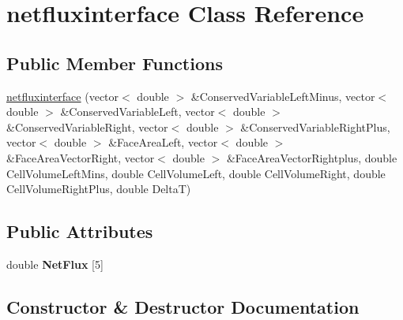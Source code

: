 \hypertarget{classnetfluxinterface}{}\section{netfluxinterface Class Reference}
\label{classnetfluxinterface}
\subsection*{Public Member Functions}
\begin{DoxyCompactItemize}
\item 
\hyperlink{classnetfluxinterface_aaa51271f4ed3cf28e7bf134cdb608589}{netfluxinterface} (vector$<$ double $>$ \&Conserved\+Variable\+Left\+Minus, vector$<$ double $>$ \&Conserved\+Variable\+Left, vector$<$ double $>$ \&Conserved\+Variable\+Right, vector$<$ double $>$ \&Conserved\+Variable\+Right\+Plus, vector$<$ double $>$ \&Face\+Area\+Left, vector$<$ double $>$ \&Face\+Area\+Vector\+Right, vector$<$ double $>$ \&Face\+Area\+Vector\+Rightplus, double Cell\+Volume\+Left\+Mins, double Cell\+Volume\+Left, double Cell\+Volume\+Right, double Cell\+Volume\+Right\+Plus, double DeltaT)
\end{DoxyCompactItemize}
\subsection*{Public Attributes}
\begin{DoxyCompactItemize}
\item 
double {\bfseries Net\+Flux} \mbox{[}5\mbox{]}\hypertarget{classnetfluxinterface_a32e1177d62968254eac419fd300c1208}{}\label{classnetfluxinterface_a32e1177d62968254eac419fd300c1208}

\end{DoxyCompactItemize}


\subsection{Constructor \& Destructor Documentation}
